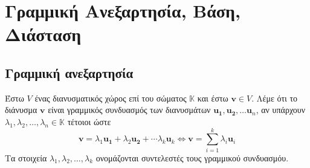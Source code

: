 


\let\vec\mathbf

\pagestyle{vangelis}



\chapter{Γραμμική Ανεξαρτησία, Βάση, Διάσταση}

\section{Γραμμική ανεξαρτησία}

\begin{dfn}
    Έστω $ V $ ένας διανυσματικός χώρος επί του σώματος $ \mathbb{K} $ και έστω 
    $ \mathbf{v} \in V $. Λέμε ότι το διάνυσμα $ \mathbf{v}$ είναι 
    \textcolor{Col2}{γραμμικός συνδυασμός} των διανυσμάτων 
    $ \mathbf{u_{1}}, \mathbf{u_{2}}, \ldots \mathbf{u}_{n} $, αν υπάρχουν 
    $ \lambda _{1}, \lambda _{2}, \ldots, \lambda _{n} \in \mathbb{K} $ τέτοιοι ώστε 
    \[
        \mathbf{v} = \lambda _{1} \mathbf{u_{1}}+ \lambda_{2} \mathbf{u_{2}}+ 
        \cdots \lambda _{k} \mathbf{u}_{k} \Leftrightarrow \mathbf{v} = 
        \sum_{i=1}^{k} \lambda _{i} \mathbf{u}_{i} 
    \]
    Τα στοιχεία $ \lambda _{1}, \lambda _{2}, \ldots, \lambda _{k} $ ονομάζονται 
    \textcolor{Col2}{συντελεστές} τους γραμμικού συνδυασμόυ.
\end{dfn}

